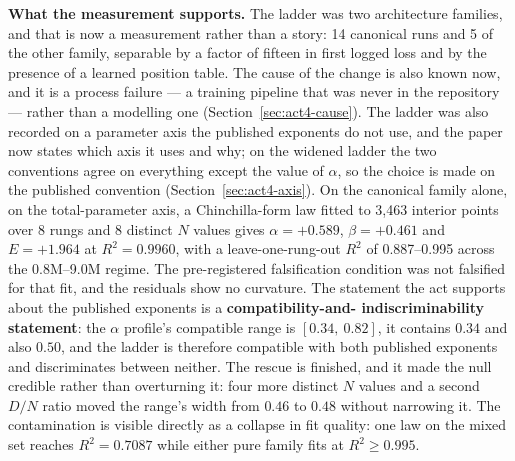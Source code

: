 \documentclass[11pt,a4paper]{article}
\begin{document}
\textbf{What the measurement supports.} The ladder was two architecture
families, and that is now a measurement rather than a story: 14 canonical runs
and 5 of the other family, separable by a factor of fifteen in first logged
loss and by the presence of a learned position table. The cause of the change
is also known now, and it is a process failure --- a training pipeline that
was never in the repository --- rather than a modelling one
(Section~\ref{sec:act4-cause}). The ladder was also recorded on a parameter
axis the published exponents do not use, and the paper now states which axis
it uses and why; on the widened ladder the two conventions agree on
everything except the value of $\alpha$, so the choice is made on the
published convention (Section~\ref{sec:act4-axis}). On the canonical
family alone, on the total-parameter axis, a Chinchilla-form law fitted to
3,463 interior points over 8 rungs and 8 distinct $N$ values gives
$\alpha = +0.589$, $\beta = +0.461$ and $E = +1.964$ at $R^2 = 0.9960$, with
a leave-one-rung-out $R^2$ of 0.887--0.995 across the 0.8M--9.0M regime. The
pre-registered falsification condition was not falsified for that fit, and the
residuals show no curvature. The statement the act
supports about the published exponents is a \textbf{compatibility-and-
indiscriminability statement}: the $\alpha$ profile's compatible range is
$[0.34,\ 0.82]$, it contains $0.34$ and also $0.50$, and the ladder is
therefore compatible with both published exponents and discriminates between
neither. The rescue is finished, and it made the null credible rather than
overturning it: four more distinct $N$ values and a second $D/N$ ratio moved
the range's width from $0.46$ to $0.48$ without narrowing it. The contamination
is visible directly as a collapse in fit quality: one law on the mixed set
reaches $R^2 = 0.7087$ while either pure family fits at $R^2 \geq 0.995$.
\end{document}
